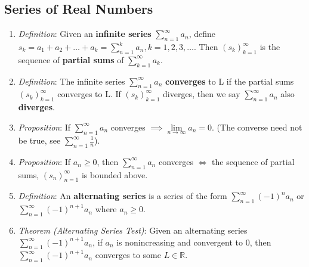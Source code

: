 \message{ !name(cheatsheet.tex)}\documentclass{article}
\newcommand{\seqn}[1]{(#1)^\infty_{n=1}}
\newcommand{\seqk}[1]{(#1)^\infty_{k=1}}
\newcommand{\infsrsn}[1]{\sum\limits^\infty_{n=1}#1}
\newcommand{\infsrsk}[1]{\sum\limits^\infty_{k=1}#1}
\newcommand{\real}{\mathbb{R}}
\newcommand{\ntoinf}{\limits_{n\rightarrow\infty}}
\newcommand{\limn}[1]{\lim\ntoinf #1}
\begin{document}
\begin{multicols*}{3}
	\section{Series of Real Numbers}
	\begin{enumerate}
		\item \emph{Definition}: Given an \textbf{infinite series} $\infsrsn{a_n}$,
		      define $s_k=a_1+a_2+\dots+a_k=\sum_{n=1}^k a_n, k=1,2,3,\dots$.
		      Then $\seqk{s_k}$ is the sequence of \textbf{partial sums} of
		      $\infsrsk{a_k}$.
		\item \emph{Definition}: The infinite series $\infsrsn{a_n}$
		      \textbf{converges} to L if the partial sums $\seqk{s_k}$ converges to
		      L. If $\seqk{s_k}$ diverges, then we say $\infsrsn{a_n}$ also
		      \textbf{diverges}.
		\item \emph{Proposition}: If $\infsrsn{a_n}$ converges
		      $\implies\limn{a_n}=0$. (The converse need not be true, see
		      $\infsrsn{\frac{1}{n}}$).
		\item \emph{Proposition}: If $a_n\geq0$, then $\infsrsn{a_n}$ converges
		      $\iff$ the sequence of partial sums, $\seqn{s_n}$ is bounded above.
		\item \emph{Definition}: An \textbf{alternating series}  is a series of the
		      form $\infsrsn{(-1)^na_n}$ or $\infsrsn{(-1)^{n+1}a_n}$ where $a_n\geq0$.
		\item \emph{Theorem (Alternating Series Test)}: Given an alternating series
		      $\infsrsn{(-1)^{n+1}a_n}$, if $a_n$ is nonincreasing and convergent to
		      0, then $\infsrsn{(-1)^{n+1}a_n}$ converges to some $L\in\real$.


\end{enumerate}
\end{multicols*}
\end{document}
